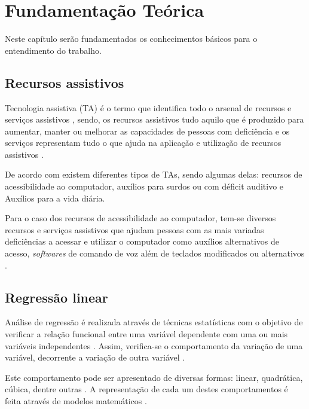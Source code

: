 \chapter{Fundamentação Teórica}
\label{ch:fundamentacao}
\par Neste capítulo ser\~ao fundamentados os conhecimentos b\'asicos para o entendimento do trabalho.

\section{Recursos assistivos}

\par Tecnologia assistiva (TA) é o termo que identifica todo o arsenal de recursos e serviços assistivos \cite{Bersch2017}, sendo, os recursos assistivos tudo aquilo que é produzido para aumentar, manter ou melhorar as capacidades de pessoas com deficiência \cite{tonollijoseberschrita2017} e os serviços representam tudo o que ajuda na aplicação e utilização de recursos assistivos \cite{tonollijoseberschrita2017}.

\par De acordo com \cite{tonollijoseberschrita2017} existem diferentes tipos de TAs, sendo algumas delas: recursos de acessibilidade ao computador, auxílios para surdos ou com déficit auditivo e Auxílios para a vida diária.

\par Para o caso dos recursos de acessibilidade ao computador, tem-se diversos recursos e serviços assistivos que ajudam pessoas com as mais variadas deficiências a acessar e utilizar o computador como auxílios alternativos de acesso, \textit{softwares} de comando de voz além de teclados modificados ou alternativos \cite{tonollijoseberschrita2017}.

\section{Regressão linear}

\par Análise de regressão é realizada através de técnicas estatísticas com o objetivo de verificar a relação funcional entre uma variável dependente com uma ou mais variáveis independentes \cite{Peternelli2003}. Assim, verifica-se o comportamento da variação de uma variável, decorrente a variação de outra variável \cite{Peternelli2003, mannprems2006}.

\par Este comportamento pode ser apresentado de diversas formas: linear, quadrática, cúbica, dentre outras \cite{Peternelli2003}. A representação de cada um destes comportamentos é feita através de modelos matemáticos \cite{mannprems2006}.

